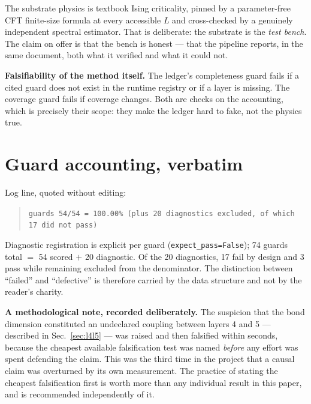 \documentclass[11pt,a4paper]{article}
\newcommand{\code}[1]{\texttt{\small #1}}
\begin{document}
The substrate physics is textbook Ising criticality, pinned by a parameter-free CFT
finite-size formula at every accessible $L$ and cross-checked by a genuinely
independent spectral estimator. That is deliberate: the substrate is the
\emph{test bench}. The claim on offer is that the bench is honest --- that the
pipeline reports, in the same document, both what it verified and what it could not.

\medskip
\noindent\textbf{Falsifiability of the method itself.} The ledger's completeness
guard fails if a cited guard does not exist in the runtime registry or if a layer is
missing. The coverage guard fails if coverage changes. Both are checks on the
accounting, which is precisely their scope: they make the ledger hard to fake, not
the physics true.

\appendix
\section{Guard accounting, verbatim}
\label{app:accounting}

\noindent Log line, quoted without editing:
\begin{quote}
\code{guards 54/54 = 100.00\% (plus 20 diagnostics excluded, of which 17 did not
pass)}
\end{quote}

\noindent Diagnostic registration is explicit per guard (\code{expect\_pass=False});
74 guards total $=$ 54 scored $+$ 20 diagnostic. Of the 20 diagnostics, 17 fail by
design and 3 pass while remaining excluded from the denominator. The distinction
between ``failed'' and ``defective'' is therefore carried by the data structure and
not by the reader's charity.

\medskip
\noindent\textbf{A methodological note, recorded deliberately.} The suspicion that
the bond dimension constituted an undeclared coupling between layers 4 and 5 ---
described in Sec.~\ref{sec:l4l5} --- was raised and then falsified within seconds,
because the cheapest available falsification test was named \emph{before} any
effort was spent defending the claim. This was the third time in the project that a
causal claim was overturned by its own measurement. The practice of stating the
cheapest falsification first is worth more than any individual result in this paper,
and is recommended independently of it.



\end{document}
